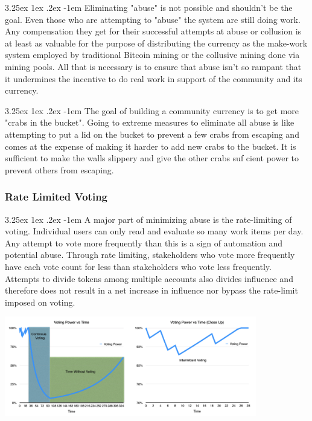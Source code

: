 \documentclass{article}
\makeatletter
\renewcommand\paragraph{\@startsection{paragraph}{5}{\z@}%
  {3.25ex \@plus1ex \@minus.2ex}%
  {-1em}%
  {\normalfont\normalsize\bfseries}}
\makeatother
\begin{document}
                    \paragraph{}
                        Eliminating "abuse" is not possible and shouldn't be the goal. Even those who are attempting to "abuse" the system are still doing work. Any compensation they get for their successful attempts at abuse or collusion is at least as valuable for the purpose of distributing the currency as the make-work system employed by traditional Bitcoin mining or the collusive mining done via mining pools. All that is necessary is to ensure that abuse isn't so rampant that it undermines the incentive to do real work in support of the community and its currency.

                    \paragraph{}
                        The goal of building a community currency is to get more "crabs in the bucket". Going to extreme measures to eliminate all abuse is like attempting to put a lid on the bucket to prevent a few crabs from escaping and comes at the expense of making it harder to add new crabs to the bucket. It is sufficient to make the walls slippery and give the other crabs suf cient power to prevent others from escaping.

            \subsubsection{Rate Limited Voting}

                \paragraph{}
                    A major part of minimizing abuse is the rate-limiting of voting. Individual users can only read and evaluate so many work items per day. Any attempt to vote more frequently than this is a sign of automation and potential abuse. Through rate limiting, stakeholders who vote more frequently have each vote count for less than stakeholders who vote less frequently. Attempts to divide tokens among multiple accounts also divides influence and therefore does not result in a net increase in influence nor bypass the rate-limit imposed on voting.

                \includegraphics[width=11cm]{img_voting_rate_limiting}
\end{document}
